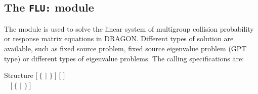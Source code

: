 \subsection{The {\tt FLU:} module}\label{sect:FLUData}

The  module is used to solve the linear system of multigroup collision
probability or response matrix equations in DRAGON. Different types of solution are
available, such as fixed source problem, fixed source eigenvalue problem (GPT type) or
different types of eigenvalue problems. The calling specifications are:

\begin{DataStructure}{Structure }
 \moc{:=}  $[~\{$  $|$  $\}~]$  
   $[$  $]$ \\
$~~~~[~\{$   $|$  $\}~]$ \moc{::} 
\end{DataStructure}

